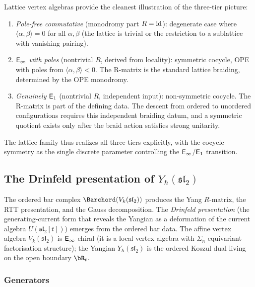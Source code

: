 \begin{remark}
\label{rem:lattice-three-tier}
Lattice vertex algebras provide the cleanest illustration of the
three-tier picture:
\begin{enumerate}[label=(\roman*)]
\item \emph{Pole-free commutative} (monodromy part $R=\mathrm{id}$):
 degenerate case where
 $\langle\alpha,\beta\rangle = 0$ for all $\alpha, \beta$ (the lattice
 is trivial or the restriction to a sublattice with vanishing pairing).
\item \emph{$\mathsf{E}_{\infty}$ with poles} (nontrivial $R$, derived from locality):
 symmetric cocycle, OPE with poles from
 $\langle\alpha,\beta\rangle < 0$. The R-matrix is the standard lattice
 braiding, determined by the OPE monodromy.
\item \emph{Genuinely $\mathsf{E}_1$} (nontrivial $R$, independent input):
 non-symmetric cocycle. The R-matrix is part of the defining data.
 The descent from ordered to unordered configurations requires this
 independent braiding datum, and a symmetric quotient exists only
 after the braid action satisfies strong unitarity.
\end{enumerate}
The lattice family thus realizes all three tiers explicitly, with the
cocycle symmetry as the single discrete parameter controlling the
$\mathsf{E}_{\infty}$/$\mathsf{E}_1$ transition.
\end{remark}


\subsection{The Drinfeld presentation of $Y_\hbar(\mathfrak{sl}_2)$}
\label{subsec:drinfeld-yangian-sl2}

The ordered bar complex $\Barchord(V_k(\mathfrak{sl}_2))$ produces the
Yang $R$-matrix, the RTT presentation, and the Gauss decomposition.
The \emph{Drinfeld presentation} (the generating-current
form that reveals the Yangian as a deformation of the current algebra
$U(\mathfrak{sl}_2[t])$) emerges from the ordered bar data. The affine vertex algebra
$V_k(\mathfrak{sl}_2)$ is $\mathsf{E}_{\infty}$-chiral (it is a local vertex algebra
with $\Sigma_n$-equivariant factorisation structure); the Yangian
$Y_\hbar(\mathfrak{sl}_2)$ is the ordered Koszul dual living on the
open boundary $\bR_t$.

\subsubsection*{Generators}

